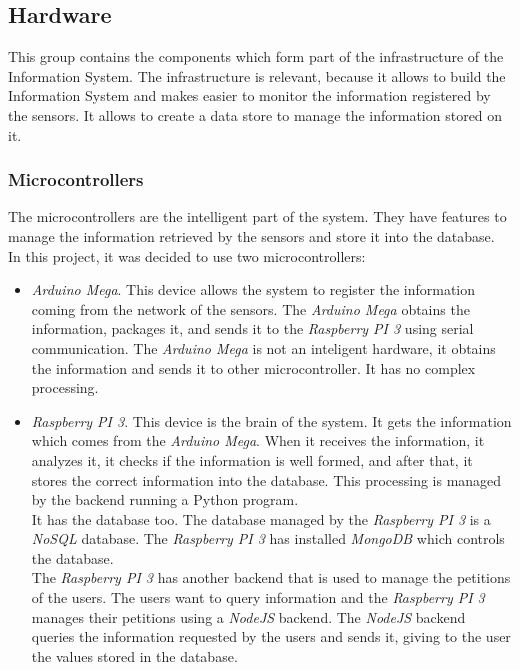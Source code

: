 \subsection{Hardware}

This group contains the components which form part of the infrastructure of the Information System. The infrastructure is relevant, because it allows to build the Information System and makes easier to monitor the information registered by the sensors. It allows to create a data store to manage the information stored on it.

\subsubsection{Microcontrollers}

The microcontrollers are the intelligent part of the system. They have features to manage the information retrieved by the sensors and store it into the database. In this project, it was decided to use two microcontrollers:

\begin{itemize}

\item \textit{Arduino Mega}. This device allows the system to register the information coming from the network of the sensors. The \textit{Arduino Mega} obtains the information, packages it, and sends it to the \textit{Raspberry PI 3} using serial communication. The \textit{Arduino Mega} is not an inteligent hardware, it obtains the information and sends it to other microcontroller. It has no complex processing.\\

\item \textit{Raspberry PI 3}. This device is the brain of the system. It gets the information which comes from the \textit{Arduino Mega}. When it receives the information, it analyzes it, it checks if the information is well formed, and after that, it stores the correct information into the database. This processing is managed by the backend running a Python program.\\

It has the database too. The database managed by the \textit{Raspberry PI 3} is a \textit{NoSQL} database. The \textit{Raspberry PI 3} has installed \textit{MongoDB} which controls the database.\\

The \textit{Raspberry PI 3} has another backend that is used to manage the petitions of the users. The users want to query information and the \textit{Raspberry PI 3} manages their petitions using a \textit{NodeJS} backend. The \textit{NodeJS} backend queries the information requested by the users and sends it, giving to the user the values stored in the database.

\end{itemize}

